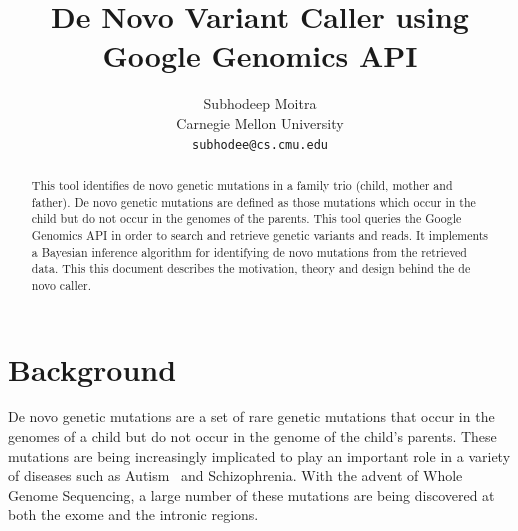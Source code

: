\documentclass{article}
\begin{document}
\title{De Novo Variant Caller using Google Genomics API}

\author{
	Subhodeep Moitra\\ 
	Carnegie Mellon University \\
	{\tt subhodee@cs.cmu.edu}
}

\maketitle

\begin{abstract}
This tool identifies de novo genetic mutations in a family trio (child, mother and father). De novo genetic mutations are defined as those mutations which occur in the child but do not occur in the genomes of the parents. This tool queries the Google Genomics API in order to search and retrieve genetic variants and reads. It implements a Bayesian inference algorithm for identifying  de novo mutations from the retrieved data. This this document describes the motivation, theory and design behind the de novo caller. 
\end{abstract} 

\section{Background}
De novo genetic mutations are a set of rare genetic mutations that occur in the genomes of a child but do not occur in the genome of the child's parents. These mutations are being increasingly implicated to play an important role in a variety of diseases such as Autism~\cite{Michaelson2012} and Schizophrenia. With the advent of Whole Genome Sequencing, a large number of these mutations are being discovered at both the exome and the intronic regions. 
\end{document}
